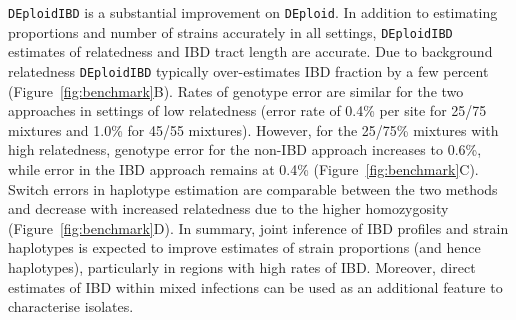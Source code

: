 \documentclass[9pt,lineno]{elife}
\begin{document}
\texttt{DEploidIBD} is a substantial improvement on \texttt{DEploid}. In addition to estimating proportions and number of strains accurately in all settings, \texttt{DEploidIBD} estimates of relatedness and IBD tract length are  accurate.  Due to background relatedness {\tt DEploidIBD} typically over-estimates IBD fraction by a few percent  (Figure~\ref{fig:benchmark}B). Rates of genotype error are similar for the two approaches in settings of low relatedness (error rate of 0.4\% per site for 25/75 mixtures and 1.0\% for 45/55 mixtures).  However, for the 25/75\% mixtures with high relatedness, genotype error for the non-IBD approach increases to 0.6\%, while error in the IBD approach remains at 0.4\% (Figure~\ref{fig:benchmark}C). Switch errors in haplotype estimation are comparable between the two methods and decrease with increased relatedness due to the higher homozygosity (Figure~\ref{fig:benchmark}D). In summary, joint inference of IBD profiles and strain haplotypes is expected to improve estimates of strain proportions (and hence haplotypes), particularly in regions with high rates of IBD. Moreover, direct estimates of IBD within mixed infections can be used as an additional feature to characterise isolates.
\end{document}
